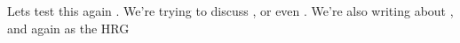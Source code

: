 \documentclass[a4paper,australian,oneside,10pt,footlines=3]{scrbook}%
\theoremstyle{remark}
\begin{document}
Lets test this again \parencite{HREOC1997}. We're trying to discuss \textcite{HREOC1997}, or even \textcite{HREOC1998}.
We're also writing about \textcite{UniSA-HRG}, and again as the HRG \parencite{UniSAHorizon2020}
\textcite{Plato1967}
\printbibliography[heading=bibintoc,nottype=artwork]
\end{document}
